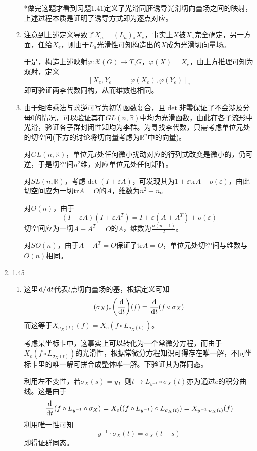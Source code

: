 \documentclass[a4paper,UTF8,fontset=windows,10pt]{ctexart}
\newcommand*{\dr}{\hspace{0.07em}\mathrm{d}}
\begin{document}
\begin{enumerate}
\begin{enumerate}[(1)]
        *做完这题才看到习题1.41定义了光滑同胚诱导光滑切向量场之间的映射，上述过程本质是证明了诱导方式即为逐点对应。
    
        \item 注意到上述定义导致了$X_a=(L_a)_*X_e$，事实上$X$被$X_e$完全确定，另一方面，任给$X_e$，则由于$L_a$光滑性可知构造出的$X$成为光滑切向量场。
        
        于是，构造上述映射$\varphi:\mathfrak{X}(G)\to T_eG$，$\varphi(X)=X_e$，由上方推理可知为双射，定义
        $$[X_e,Y_e]=[\varphi(X_e),\varphi(Y_e)]_e$$
        即可验证两李代数同构，从而维数也相同。
    
        \item 由于矩阵乘法与求逆可写为初等函数复合，且$\det$非零保证了不会涉及分母0的情况，可以验证其在$GL(n,\mathbb{R})$中均为光滑函数，由此在各子流形中光滑，验证各子群封闭性知均为李群。为寻找李代数，只需考虑单位元处的切空间(下方的讨论将切向量考虑为$\mathbb{R}^n$中的向量)。
        
        对$GL(n,\mathbb{R})$，单位元$I$处任何微小扰动对应的行列式改变是微小的，仍可逆，于是切空间$n^2$维，对应单位元处任何矩阵。
    
        对$SL(n,\mathbb{R})$，考虑$\det(I+\varepsilon A)$，可发现其为$1+\varepsilon\mathrm{tr}A+o(\varepsilon)$，由此切空间应为一切$\mathrm{tr}A=O$的$A$，维数为$n^2-n$。
    
        对$O(n)$，由于
        $$(I+\varepsilon A)(I+\varepsilon A^T)=I+\varepsilon(A+A^T)+o(\varepsilon)$$
        切空间应为一切$A+A^T=O$的$A$，维数为$\frac{n(n-1)}{2}$。
    
        对$SO(n)$，由于$A+A^T=O$保证了$\mathrm{tr} A=O$，单位元处切空间与维数与$O(n)$相同。
    \end{enumerate}
    
    \item 1.45
    \begin{enumerate}[(1)]
        \item 这里$\dr/\dr t$代表$t$点切向量场的基，根据定义可知
        $$(\sigma_X)_*\bigg(\frac{\dr}{\dr t}\bigg)(f)=\frac{\dr}{\dr t}(f\circ\sigma_X)$$
        而这等于$X_{\sigma_X(t)}(f)=X_e(f\circ L_{\sigma_X(t)})$。
    
        考虑某坐标卡中，这事实上可以转化为一个常微分方程，而由于$X_e(f\circ L_{\sigma_X(t)})$的光滑性，根据常微分方程知识可得存在唯一解，不同坐标卡里的唯一解可拼合成整体唯一解。下验证其为群同态。
    
        利用左不变性，若$\sigma_X(s)=y$，则$t\to L_{y^{-1}}\circ\sigma_X(t)$亦为通过$e$的积分曲线。这是由于
        $$\frac{\dr}{\dr t}(f\circ L_{y^{-1}}\circ\sigma_X)=X_e((f\circ L_{y^{-1}})\circ L_{\sigma_X(t)})=X_{y^{-1}\cdot\sigma_X(t)}(f)$$
        利用唯一性可知
        $$y^{-1}\cdot\sigma_X(t)=\sigma_X(t-s)$$
        即得证群同态。
    

\end{enumerate}
\end{enumerate}
\end{document}
